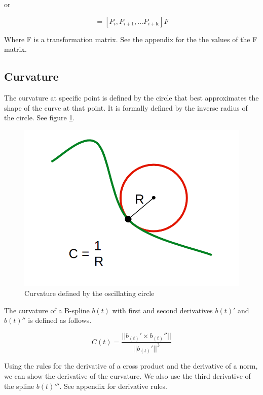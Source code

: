 \documentclass{article}
\begin{document}
or

\begin{equation}
    [\beta_0, \beta_1, ... \beta_{\textbf{k}}] = [P_i, P_{i+1}, ... P_{i+\textbf{k}}] F
\end{equation}

Where F is a transformation matrix. See the appendix for the the values of the F matrix.

\subsection{Curvature}

The curvature at specific point is defined by the circle that best approximates the shape of the curve at that point. It is formally defined by the inverse radius of the circle. See figure \ref{Fig:Curvature}. 

\begin{figure}[h]
\begin{center}
\includegraphics[scale=.23]{Curvature.png}
\end{center}
\caption{Curvature defined by the oscillating circle}
\label{Fig:Curvature}
\end{figure}

The curvature of a B-spline \(b(t)\) with first and second derivatives \(b(t)'\) and \(b(t)''\) is defined as follows.

\begin{equation} \label{eq:curvature}
    C(t) = \frac{||b_{(t)}' \times b_{(t)}''||}{||b_{(t)}'||^3}
\end{equation}

Using the rules for the derivative of a cross product and the derivative of a norm, we can show the derivative of the curvature. We also use the third derivative of the spline \(b(t)'''\). See appendix for derivative rules.
\end{document}
